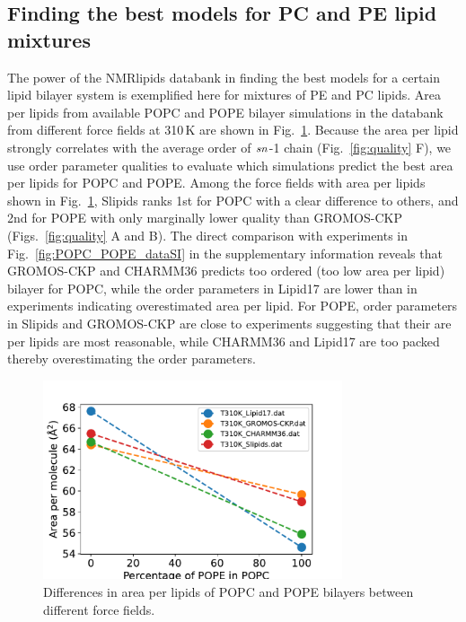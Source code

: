 \documentclass[fleqn,10pt]{wlscirep}
\begin{document}
\subsection{Finding the best models for PC and PE lipid mixtures}
The power of the NMRlipids databank in finding the best models for a certain lipid bilayer system is exemplified here for mixtures of PE and PC lipids. Area per lipids from available POPC and POPE bilayer simulations in the databank from different force fields at 310\,K are shown in Fig.~\ref{fig:POPCPOPEapls}. Because the area per lipid strongly correlates with the average order of $\it{sn}$-1 chain (Fig.~\ref{fig:quality} F), we use order  parameter qualities to evaluate which simulations predict the best area per lipids for POPC and POPE. Among the force fields with area per lipids shown in Fig.~\ref{fig:POPCPOPEapls}, Slipids ranks 1st for POPC with a clear difference to others, and 2nd for POPE with only marginally lower quality than GROMOS-CKP (Figs.~\ref{fig:quality} A and B). The direct comparison with experiments in Fig.~\ref{fig:POPC_POPE_dataSI} in the supplementary information reveals that GROMOS-CKP and CHARMM36 predicts too ordered (too low area per lipid) bilayer for POPC, while the order parameters in Lipid17 are lower than in experiments indicating overestimated area per lipid. For POPE, order parameters in  Slipids and GROMOS-CKP are close to experiments suggesting that their are per lipids are most reasonable, while CHARMM36 and Lipid17 are too packed thereby overestimating the order parameters. 
\begin{figure}[tbp]
    \centering
    \includegraphics[width=88mm]{Figures/APL.pdf}
    \caption{Differences in area per lipids of POPC and POPE bilayers between different force fields.  
    }
    \label{fig:POPCPOPEapls}
\end{figure}
\end{document}
